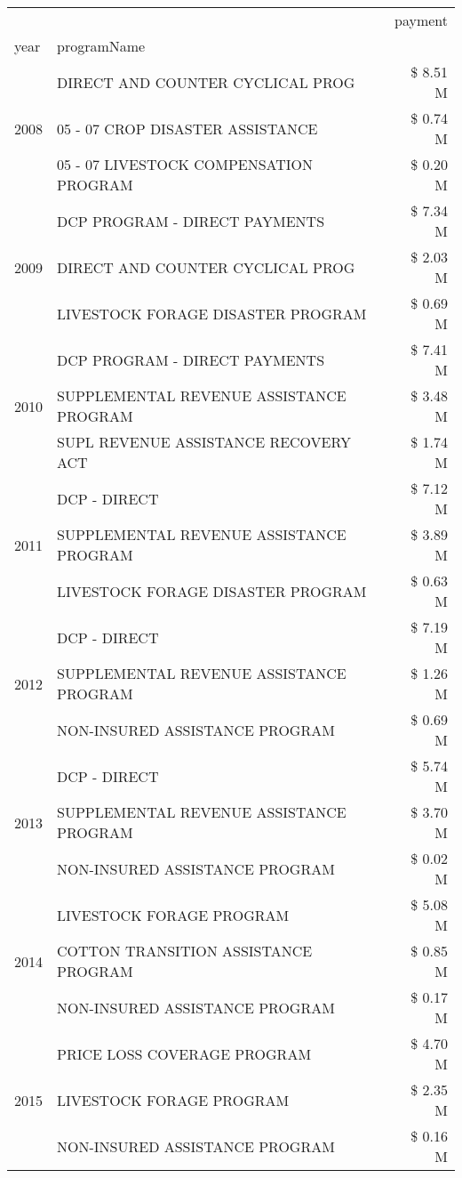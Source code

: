 \begin{tabular}{llr}
\toprule
 &  & payment \\
year & programName &  \\
\midrule
\multirow[t]{3}{*}{2008} & DIRECT AND COUNTER CYCLICAL PROG & \$ 8.51 M \\
 & 05 - 07 CROP DISASTER ASSISTANCE & \$ 0.74 M \\
 & 05 - 07 LIVESTOCK COMPENSATION PROGRAM & \$ 0.20 M \\
\cline{1-3}
\multirow[t]{3}{*}{2009} & DCP PROGRAM - DIRECT PAYMENTS & \$ 7.34 M \\
 & DIRECT AND COUNTER CYCLICAL PROG & \$ 2.03 M \\
 & LIVESTOCK FORAGE DISASTER  PROGRAM & \$ 0.69 M \\
\cline{1-3}
\multirow[t]{3}{*}{2010} & DCP PROGRAM - DIRECT PAYMENTS & \$ 7.41 M \\
 & SUPPLEMENTAL REVENUE ASSISTANCE PROGRAM & \$ 3.48 M \\
 & SUPL REVENUE ASSISTANCE RECOVERY ACT & \$ 1.74 M \\
\cline{1-3}
\multirow[t]{3}{*}{2011} & DCP - DIRECT & \$ 7.12 M \\
 & SUPPLEMENTAL REVENUE ASSISTANCE PROGRAM & \$ 3.89 M \\
 & LIVESTOCK FORAGE DISASTER PROGRAM & \$ 0.63 M \\
\cline{1-3}
\multirow[t]{3}{*}{2012} & DCP - DIRECT & \$ 7.19 M \\
 & SUPPLEMENTAL REVENUE ASSISTANCE PROGRAM & \$ 1.26 M \\
 & NON-INSURED ASSISTANCE PROGRAM & \$ 0.69 M \\
\cline{1-3}
\multirow[t]{3}{*}{2013} & DCP - DIRECT & \$ 5.74 M \\
 & SUPPLEMENTAL REVENUE ASSISTANCE PROGRAM & \$ 3.70 M \\
 & NON-INSURED ASSISTANCE PROGRAM & \$ 0.02 M \\
\cline{1-3}
\multirow[t]{3}{*}{2014} & LIVESTOCK FORAGE PROGRAM & \$ 5.08 M \\
 & COTTON TRANSITION ASSISTANCE PROGRAM & \$ 0.85 M \\
 & NON-INSURED ASSISTANCE PROGRAM & \$ 0.17 M \\
\cline{1-3}
\multirow[t]{3}{*}{2015} & PRICE LOSS COVERAGE PROGRAM & \$ 4.70 M \\
 & LIVESTOCK FORAGE PROGRAM & \$ 2.35 M \\
 & NON-INSURED ASSISTANCE PROGRAM & \$ 0.16 M \\

\end{tabular}
